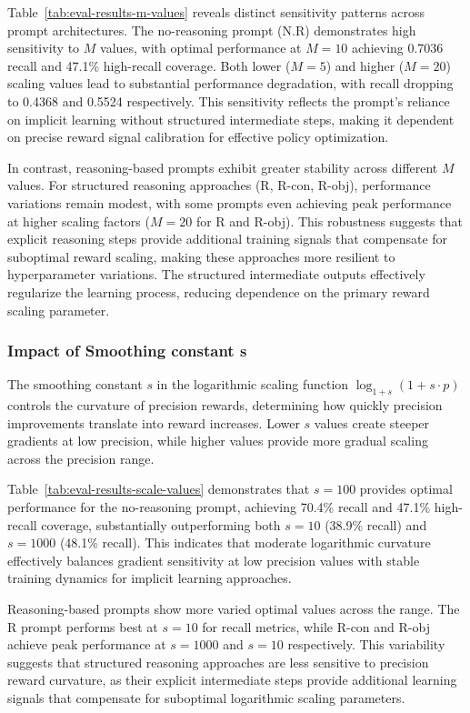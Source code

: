 Table~\ref{tab:eval-results-m-values} reveals distinct sensitivity patterns across prompt architectures. The no-reasoning prompt (N.R) demonstrates high sensitivity to $M$ values, with optimal performance at $M=10$ achieving 0.7036 recall and 47.1\% high-recall coverage. Both lower ($M=5$) and higher ($M=20$) scaling values lead to substantial performance degradation, with recall dropping to 0.4368 and 0.5524 respectively. This sensitivity reflects the prompt's reliance on implicit learning without structured intermediate steps, making it dependent on precise reward signal calibration for effective policy optimization.

In contrast, reasoning-based prompts exhibit greater stability across different $M$ values. For structured reasoning approaches (R, R-con, R-obj), performance variations remain modest, with some prompts even achieving peak performance at higher scaling factors ($M=20$ for R and R-obj). This robustness suggests that explicit reasoning steps provide additional training signals that compensate for suboptimal reward scaling, making these approaches more resilient to hyperparameter variations. The structured intermediate outputs effectively regularize the learning process, reducing dependence on the primary reward scaling parameter.


\subsubsection{Impact of Smoothing constant s}


The smoothing constant $s$ in the logarithmic scaling function $\log_{1+s}(1 + s \cdot p)$ controls the curvature of precision rewards, determining how quickly precision improvements translate into reward increases. Lower $s$ values create steeper gradients at low precision, while higher values provide more gradual scaling across the precision range.

Table~\ref{tab:eval-results-scale-values} demonstrates that $s=100$ provides optimal performance for the no-reasoning prompt, achieving 70.4\% recall and 47.1\% high-recall coverage, substantially outperforming both $s=10$ (38.9\% recall) and $s=1000$ (48.1\% recall). This indicates that moderate logarithmic curvature effectively balances gradient sensitivity at low precision values with stable training dynamics for implicit learning approaches.

Reasoning-based prompts show more varied optimal values across the range. The R prompt performs best at $s=10$ for recall metrics, while R-con and R-obj achieve peak performance at $s=1000$ and $s=10$ respectively. This variability suggests that structured reasoning approaches are less sensitive to precision reward curvature, as their explicit intermediate steps provide additional learning signals that compensate for suboptimal logarithmic scaling parameters.


